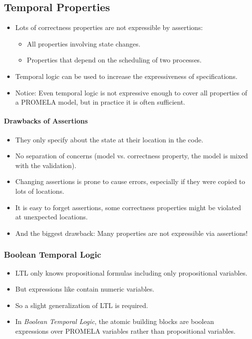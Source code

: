 		\subsection{Temporal Properties}
			\begin{itemize}
				\item Lots of correctness properties are not expressible by assertions:
					\begin{itemize}
						\item All properties involving state changes.
						\item Properties that depend on the scheduling of two processes.
					\end{itemize}
				\item Temporal logic can be used to increase the expressiveness of specifications.
				\item Notice: Even temporal logic is not expressive enough to cover all properties of a PROMELA model, but in practice it is often sufficient.
			\end{itemize}
		
			\paragraph{Drawbacks of Assertions}
				\begin{itemize}
					\item They only specify about the state at their location in the code.
					\item No separation of concerns (model vs. correctness property, the model is mixed with the validation).
					\item Changing assertions is prone to cause errors, especially if they were copied to lots of locations.
					\item It is easy to forget assertions, some correctness properties might be violated at unexpected locations.
					\item And the biggest drawback: Many properties are not expressible via assertions!
				\end{itemize}

			\subsubsection{Boolean Temporal Logic}
				\begin{itemize}
					\item LTL only knows propositional formulas including only propositional variables.
					\item But expressions like  contain numeric variables.
					\item So a slight generalization of LTL is required.
					\item In \textit{Boolean Temporal Logic}, the atomic building blocks are boolean expressions over PROMELA variables rather than propositional variables.
				\end{itemize}
		
